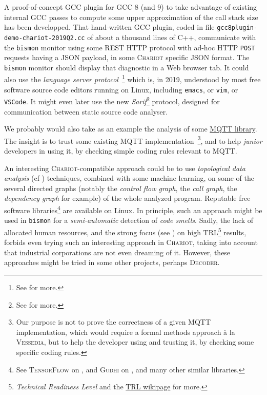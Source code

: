 A proof-of-concept GCC plugin for GCC 8 (and 9) to take advantage of
existing internal GCC passes to compute some upper approximation of
the call stack size has been developped. That hand-written GCC plugin,
coded in file \texttt{gcc8plugin-demo-chariot-2019Q2.cc} of about a
thousand lines of C++, communicate with the \texttt{bismon} monitor
using some REST HTTP protocol with ad-hoc HTTP \texttt{POST} requests
having a JSON payload, in some \textsc{Chariot} specific JSON
format. The \texttt{bismon} monitor should display that diagnostic in
a Web browser tab. It could also use the \emph{language server
  protocol}~\footnote{See  for more.}
which is, in 2019, understood by most free software source code
editors running on Linux, including \texttt{emacs}, or \texttt{vim},
or \texttt{VSCode}. It might even later use the new
\emph{Sarif}\footnote{See
  for more.}  protocol, designed for communication between static
source code analyser.


We probably would also take as an example the analysis of some
\href{http://mqtt.org/}{MQTT library}. The insight is to trust some
existing MQTT implementation~\footnote{Our purpose is not to prove the
  correctness of a given MQTT implementation, which would require a
  formal methods approach à la \textsc{Vessedia}, but to help the
  developer using and trusting it, by checking some specific coding
  rules.}, and to help \emph{junior} developers in using it, by
checking simple coding rules relevant to MQTT.

An interesting \textsc{Chariot}-compatible approach could be to use
\emph{topological data analysis} 
 (cf
\cite{Chazal:2017:topodatanalys}) techniques, combined with some
machine learning, on some of the several directed graphs (notably the
\emph{control flow graph}, the \emph{call graph}, the \emph{dependency
  graph} for example) of the whole analyzed program. Reputable free
software libraries\footnote{See \textsc{TensorFlow} on
  , and \textsc{Gudhi} on
  , and many other similar
  libraries.} are available on Linux. In principle, such an approach
might be used in \texttt{bismon} for a \emph{semi-automatic} detection
of   \emph{code smells}. Sadly,
the lack of allocated human resources, and the strong focus (see
\cite{Heder:2017:TRL})  on high
TRL\footnote{\emph{Technical Readiness Level} and the
  \href{https://en.wikipedia.org/wiki/Technology\_readiness_level}{TRL
    wikipage} for more.} results, forbids even trying such an
interesting approach in \textsc{Chariot}, taking into account that
industrial corporations are not even dreaming of it. However, these
approaches might be tried in some other projects, perhaps
\textsc{Decoder}.

